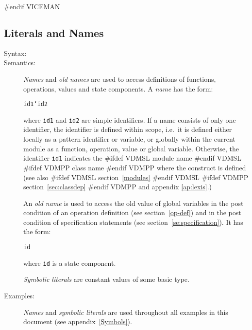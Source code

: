 \documentclass[\pformat,12pt]{article}
\begin{document}
#endif VICEMAN

\subsection{Literals and Names}

\begin{description}
\item[Syntax:]




\item[Semantics:] {\it Names\/} and {\it old names\/} are used to access
  definitions of functions, operations, values and state components. A {\it
    name\/} has the form:
  \begin{alltt}
    id1`id2
  \end{alltt}
  where {\tt id1} and {\tt id2} are simple identifiers. If a name consists
  of only one identifier, the identifier is defined within scope, i.e.\ it
  is defined either locally as a pattern identifier or variable,
  or globally within the current module as a function, operation,
  value or global variable. 
  Otherwise, the identifier {\tt id1} indicates the
#ifdef VDMSL
module name
#endif VDMSL
#ifdef VDMPP
class name
#endif VDMPP
where the
  construct is defined (see also
#ifdef VDMSL
  section~\ref{modules}
#endif VDMSL
#ifdef VDMPP
  section~\ref{sec:classdep}
#endif VDMPP
and appendix \ref{ap:lexis}.)

  An {\it old name\/} is used to access the old value of global
  variables in the post condition of an operation definition (see
  section~\ref{op-def}) and in the post condition of specification
  statements (see section~\ref{se:specification}).  It has the form:

  \begin{alltt} 
    id~ 
  \end{alltt} 
  where {\tt id} is a state component.

  {\it Symbolic literals\/} are constant values of some basic type.

\item[Examples:] {\it Names} and {\it symbolic literals\/} are used
  throughout all examples in this document (see appendix~\ref{Symbols}).


\end{description}
\end{document}
